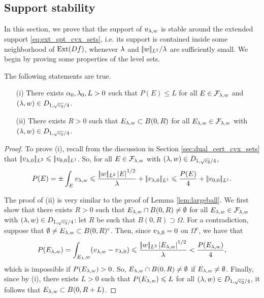 \subsection{Support stability}
In this section, we prove that the support of $u_{\lambda,w}$ is stable around the extended support \eqref{eq:ext_spt_cvx_sets}, i.e.  its support is contained inside some neighborhood of $\operatorname{Ext}(Df)$, 
whenever $\lambda$ and $ |\!| w |\!|_{L^2}/\lambda$ are sufficiently small.
We begin by proving some properties of the level sets.
\begin{prop}\label{prop:L1_props}
The following statements are true.
\begin{itemize}
\item[(i)] There exists $\alpha_0,\lambda_0,L >0$ such that $P(E)\leq L$ for all $E\in \mathcal{F}_{\lambda,w}$ and $(\lambda,w)\in D_{1,\sqrt{c_2}/4}$.
\item[(ii)] There exists $R>0$ such that $E_{\lambda,w}\subset B(0,R)$ for all $E_{\lambda,w}\in \mathcal{F}_{\lambda,w}$ with $(\lambda,w)\in D_{1,\sqrt{c_2}/4}$.
\end{itemize}
\end{prop}
\begin{proof}

To prove (i), 
recall from the discussion in Section \ref{sec:dual_cert_cvx_sets} that $|\!| v_{\lambda,0} |\!|_{L^2} \leqslant |\!| v_{0,0} |\!|_{L^1}$.
So, for all $E\in\mathcal{F}_{\lambda,w}$ with $(\lambda,w)\in D_{1,\sqrt{c_2}/4}$,
 \begin{align*}
 P(E) = \pm\int_E v_{\lambda,w} \leqslant \frac{|\!| w |\!|_{L^2}\left| E \right|^{1/2}}{\lambda}+ |\!| v_{\lambda,0} |\!|_{L^1}
 \leqslant \frac{ P(E)}{4}  + |\!| v_{0,0} |\!|_{L^1}.
 \end{align*}

The proof of (ii) is very similar to the proof of Lemma \ref{lem:largeball}. We first show that there exists $R>0$ such that $E_{\lambda,w}\cap B(0,R)\neq \emptyset$ for all $E_{\lambda,w}\in\mathcal{F}_{\lambda,w}$ with $(\lambda,w)\in D_{1,\sqrt{c_2}/4}$: let $R$ be such that $B(0,R)\supset \Omega$. For a contradiction, suppose that $\emptyset\neq E_{\lambda,w}\subset B(0,R)^c$. Then, since $v_{\lambda,0} = 0$ on $\Omega^c$, we have that
$$
P(E_{\lambda,w}) = \int_{E_\lambda,w}(v_{\lambda,w} - v_{\lambda,0})  \leqslant \frac{|\!| w |\!|_{L^2} \left| E_{\lambda,w} \right|^{1/2}}{\lambda}< \frac{P(E_{\lambda,w})}{4},
$$ 
which is impossible if $P(E_{\lambda,w}) > 0$. So, $E_{\lambda,w}\cap B(0,R)\neq \emptyset$ if $E_{\lambda,w}\neq\emptyset$. Finally, since by (i), there exists $L>0$ such that $P(E_{\lambda,w})\leqslant L$ for all $(\lambda,w)\in D_{1,\sqrt{c_2}/4}$,  it follows that $E_{\lambda,w}\subset B(0,R+L)$.
 
 
\end{proof}


